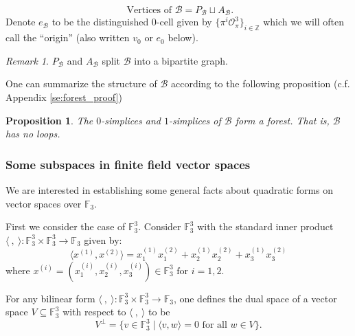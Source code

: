 \documentclass{eptcs}
\newtheorem{proposition}[theorem]{Proposition}
\theoremstyle{remark}
\newtheorem{remark}[theorem]{Remark}
\theoremstyle{definition}
\begin{document}
\[\text{ Vertices of }\mathcal{B} = P_{\mathcal{B}} \sqcup A_\mathcal{B}.\]
Denote $e_{\mathcal{B}}$ to be the distinguished $0$-cell given by $\{\pi^{i} \mathcal{O}_{\pi}^{3}\}_{i \in \mathbb{Z}}$ which we will often call the ``origin'' (also written $v_0$ or $e_0$ below).

\begin{remark}
    $P_\mathcal{B}$ and $A_\mathcal{B}$ split $\mathcal{B}$ into a bipartite graph.
\end{remark}

One can summarize the structure of $\mathcal{B}$ according to the following proposition (c.f. Appendix \ref{se:forest_proof})
\begin{proposition} \label{pr:forest}
    The $0$-simplices and $1$-simplices of $\mathcal{B}$ form a forest. That is, $\mathcal{B}$ has no loops.
\end{proposition}
\subsubsection{Some subspaces in finite field vector spaces}

We are interested in establishing some general facts about quadratic forms on vector spaces over $\mathbb{F}_{3}$.


First we consider the case of $\mathbb{F}_{3}^{3}$.
  Consider $\mathbb{F}_{3} ^{3}$ with the standard inner product $\langle \ , \ \rangle : \mathbb{F}_{3}^{3} \times \mathbb{F}_{3}^{3} \to \mathbb{F}_{3}$ given by: 
  \begin{equation}
      \label{eq:defi_of_angle3}
      \langle x^{(1)},x^{(2)} \rangle = x^{(1)}_{1} x^{(2)}_{1} + 
 x^{(1)}_{2} x^{(2)}_{2} + 
 x^{(1)}_{3} x^{(2)}_{3}  
  \end{equation}
  where $ x^{(i)} = (x^{(i)}_{1},
 x^{(i)}_{2}, x^{(i)}_{3}) \in \mathbb{F}_{3}^{3} \text{ for } i = 1,2.$ 

 For any bilinear form $\langle \ , \ \rangle:\mathbb{F}_{3}^{3} \times \mathbb{F}_{3}^{3} \rightarrow  \mathbb{F}_{3}$, one defines the dual space of a vector space
 $V \subseteq \mathbb{F}_{3}^{3}$ with respect to $\langle\ , \ \rangle$ to be 
 \begin{equation}
     V^{\perp} = 
     \{v \in  \mathbb{F}_{3}^{3} \mid  \langle v,w \rangle = 0 \text{ for all }w \in V \}.
 \end{equation}
\end{document}
